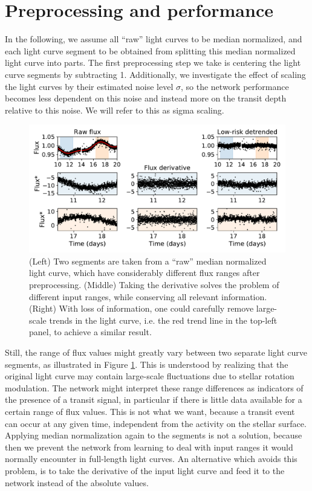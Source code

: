 \section{Preprocessing and performance}
\label{sec:preprocessing}

In the following, we assume all ``raw'' light curves to be median normalized, and each light curve segment to be obtained from splitting this median normalized light curve into parts. The first preprocessing step we take is centering the light curve segments by subtracting 1.  Additionally, we investigate the effect of scaling the light curves by their estimated noise level $\sigma$, so the network performance becomes less dependent on this noise and instead more on the transit depth relative to this noise. We will refer to this as sigma scaling.

\begin{figure}
    \centering
    \includegraphics[width=0.7\linewidth]{Experiments/Figures/Preprocessing/input-range-example.pdf}
    \caption{(Left) Two segments are taken from a ``raw'' median normalized light curve, which have considerably different flux ranges after preprocessing. (Middle) Taking the derivative solves the problem of different input ranges, while conserving all relevant information. (Right) With loss of information, one could carefully remove large-scale trends in the light curve, i.e. the red trend line in the top-left panel, to achieve a similar result.}
    \label{fig:input_ranges}
\end{figure}

Still, the range of flux values might greatly vary between two separate light curve segments, as illustrated in Figure \ref{fig:input_ranges}. This is understood by realizing that the original light curve may contain large-scale fluctuations due to stellar rotation modulation. The network might interpret these range differences as indicators of the presence of a transit signal, in particular if there is little data available for a certain range of flux values. This is not what we want, because a transit event can occur at any given time, independent from the activity on the stellar surface. Applying median normalization again to the segments is not a solution, because then we prevent the network from learning to deal with input ranges it would normally encounter in full-length light curves. An alternative which avoids this problem, is to take the derivative of the input light curve and feed it to the network instead of the absolute values.

